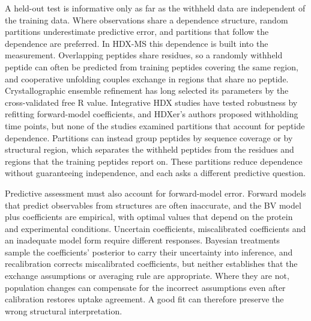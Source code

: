 A held-out test is informative only as far as the withheld data are independent of the training data. Where observations share a dependence structure, random partitions underestimate predictive error, and partitions that follow the dependence are preferred.\supercite{robertsCrossvalidationStrategiesData2017} In HDX-MS this dependence is built into the measurement. Overlapping peptides share residues, so a randomly withheld peptide can often be predicted from training peptides covering the same region, and cooperative unfolding couples exchange in regions that share no peptide.\supercite{englanderHydrogenExchangeModern1997,moulickPartiallyUnfoldedForms2015} Crystallographic ensemble refinement has long selected its parameters by the cross-validated free R value.\supercite{burnleyModellingDynamicsProtein2012} Integrative HDX studies have tested robustness by refitting forward-model coefficients,\supercite{jiaIntegratingHydrogenDeuterium2023} and HDXer's authors proposed withholding time points,\supercite{bradshawInterpretationHDXData2020} but none of the studies examined partitions that account for peptide dependence. Partitions can instead group peptides by sequence coverage or by structural region, which separates the withheld peptides from the residues and regions that the training peptides report on. These partitions reduce dependence without guaranteeing independence, and each asks a different predictive question.

Predictive assessment must also account for forward-model error. Forward models that predict observables from structures are often inaccurate,\supercite{bonomiPrinciplesProteinStructural2017} and the BV model plus coefficients are empirical, with optimal values that depend on the protein and experimental conditions.\supercite{bradshawInterpretationHDXData2020} Uncertain coefficients, miscalibrated coefficients and an inadequate model form require different responses. Bayesian treatments sample the coefficients' posterior to carry their uncertainty into inference,\supercite{wanReconcilingSimulatedEnsembles2020} and recalibration corrects miscalibrated coefficients, but neither establishes that the exchange assumptions or averaging rule are appropriate. Where they are not, population changes can compensate for the incorrect assumptions even after calibration restores uptake agreement. A good fit can therefore preserve the wrong structural interpretation.


